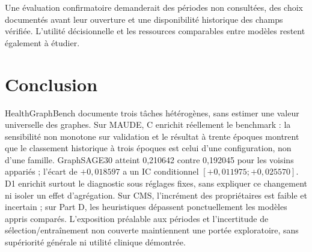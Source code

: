 Une évaluation confirmatoire demanderait des périodes non consultées, des choix documentés avant leur ouverture et une disponibilité historique des champs vérifiée. L'utilité décisionnelle et les ressources comparables entre modèles restent également à étudier.

\section{Conclusion}

HealthGraphBench documente trois tâches hétérogènes, sans estimer une valeur universelle des graphes. Sur MAUDE, C enrichit réellement le benchmark : la sensibilité non monotone sur validation et le résultat à trente époques montrent que le classement historique à trois époques est celui d'une configuration, non d'une famille. GraphSAGE30 atteint 0,210642 contre 0,192045 pour les voisins appariés ; l'écart de $+0,018597$ a un IC conditionnel $[+0,011975;+0,025570]$. D1 enrichit surtout le diagnostic sous réglages fixes, sans expliquer ce changement ni isoler un effet d'agrégation. Sur CMS, l'incrément des propriétaires est faible et incertain ; sur Part D, les heuristiques dépassent ponctuellement les modèles appris comparés. L'exposition préalable aux périodes et l'incertitude de sélection/entraînement non couverte maintiennent une portée exploratoire, sans supériorité générale ni utilité clinique démontrée.
